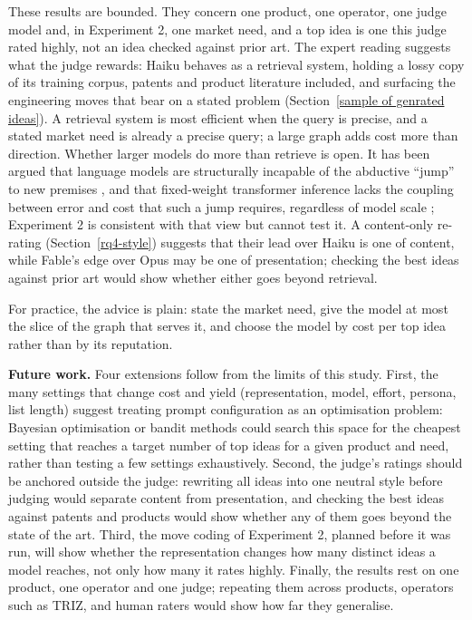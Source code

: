 These results are bounded. They concern one product, one operator, one judge model and, in Experiment 2, one market need, and a top idea is one this judge rated highly, not an idea checked against prior art. The expert reading suggests what the judge rewards: Haiku behaves as a retrieval system, holding a lossy copy of its training corpus, patents and product literature included, and surfacing the engineering moves that bear on a stated problem (Section~\ref{sample of genrated ideas}). A retrieval system is most efficient when the query is precise, and a stated market need is already a precise query; a large graph adds cost more than direction. Whether larger models do more than retrieve is open. It has been argued that language models are structurally incapable of the abductive ``jump'' to new premises \citep{Zahavy2026}, and that fixed-weight transformer inference lacks the coupling between error and cost that such a jump requires, regardless of model scale \citep{Balani2026}; Experiment 2 is consistent with that view but cannot test it. A content-only re-rating (Section~\ref{rq4-style}) suggests that their lead over Haiku is one of content, while Fable's edge over Opus may be one of presentation; checking the best ideas against prior art would show whether either goes beyond retrieval.

For practice, the advice is plain: state the market need, give the model at most the slice of the graph that serves it, and choose the model by cost per top idea rather than by its reputation.

\textbf{Future work.} Four extensions follow from the limits of this study. First, the many settings that change cost and yield (representation, model, effort, persona, list length) suggest treating prompt configuration as an optimisation problem: Bayesian optimisation or bandit methods could search this space for the cheapest setting that reaches a target number of top ideas for a given product and need, rather than testing a few settings exhaustively. Second, the judge's ratings should be anchored outside the judge: rewriting all ideas into one neutral style before judging would separate content from presentation, and checking the best ideas against patents and products would show whether any of them goes beyond the state of the art. Third, the move coding of Experiment 2, planned before it was run, will show whether the representation changes how many distinct ideas a model reaches, not only how many it rates highly. Finally, the results rest on one product, one operator and one judge; repeating them across products, operators such as TRIZ, and human raters would show how far they generalise.

